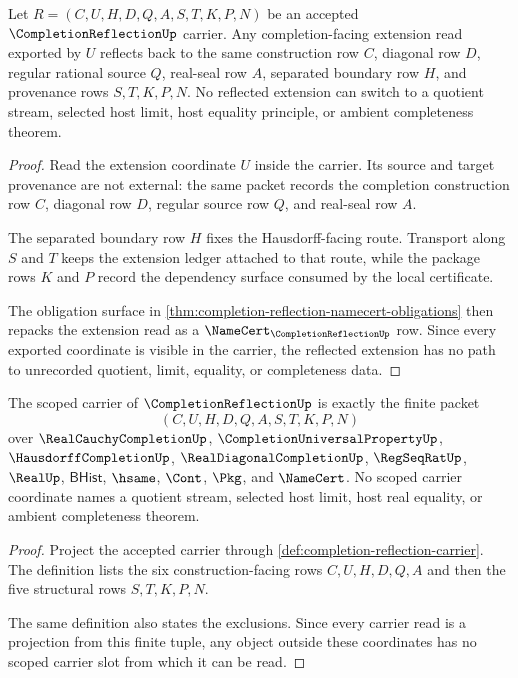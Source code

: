 \begin{theorem}
\label{thm:completion-reflection-extension-reflects}
Let $R=(C,U,H,D,Q,A,S,T,K,P,N)$ be an accepted $\CompletionReflectionUp$ carrier. Any completion-facing extension read exported by $U$ reflects back to the same construction row $C$, diagonal row $D$, regular rational source $Q$, real-seal row $A$, separated boundary row $H$, and provenance rows $S,T,K,P,N$. No reflected extension can switch to a quotient stream, selected host limit, host equality principle, or ambient completeness theorem.
\end{theorem}
\begin{proof}
Read the extension coordinate $U$ inside the carrier. Its source and target provenance are not external: the same packet records the completion construction row $C$, diagonal row $D$, regular source row $Q$, and real-seal row $A$.

The separated boundary row $H$ fixes the Hausdorff-facing route. Transport along $S$ and $T$ keeps the extension ledger attached to that route, while the package rows $K$ and $P$ record the dependency surface consumed by the local certificate.

The obligation surface in \autoref{thm:completion-reflection-namecert-obligations} then repacks the extension read as a $\NameCert_{\CompletionReflectionUp}$ row. Since every exported coordinate is visible in the carrier, the reflected extension has no path to unrecorded quotient, limit, equality, or completeness data.
\end{proof}

\begin{theorem}
\label{thm:completionreflection-carrier-scope}
The scoped carrier of $\CompletionReflectionUp$ is exactly the finite packet
$$
(C,U,H,D,Q,A,S,T,K,P,N)
$$
over $\RealCauchyCompletionUp$, $\CompletionUniversalPropertyUp$, $\HausdorffCompletionUp$, $\RealDiagonalCompletionUp$, $\RegSeqRatUp$, $\RealUp$, $\mathsf{BHist}$, $\hsame$, $\Cont$, $\Pkg$, and $\NameCert$. No scoped carrier coordinate names a quotient stream, selected host limit, host real equality, or ambient completeness theorem.
\end{theorem}
\begin{proof}
Project the accepted carrier through \autoref{def:completion-reflection-carrier}. The definition lists the six construction-facing rows $C,U,H,D,Q,A$ and then the five structural rows $S,T,K,P,N$.

The same definition also states the exclusions. Since every carrier read is a projection from this finite tuple, any object outside these coordinates has no scoped carrier slot from which it can be read.
\end{proof}

